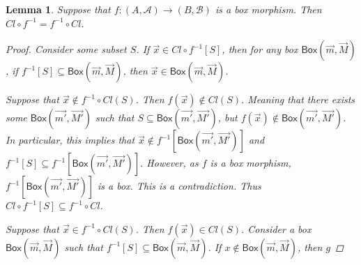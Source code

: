 \documentclass[12pt]{article}
\newtheorem{lemma}[theorem]{Lemma}
\newcommand{\bobject}{\mathsf{Box}}
\begin{document}
\begin{lemma}
    Suppose that $f:(A,\mathcal{A})\to(B,\mathcal{B})$ is a
    box morphism. Then $Cl\circ f^{-1}=f^{-1}\circ Cl$.
    \begin{proof}
        \par Consider some subset $S$.
        If $\vec{x}\in Cl\circ f^{-1}[S]$,
        then for any box $\bobject(\vec{m},\vec{M})$, if
        $f^{-1}[S]\subseteq \bobject(\vec{m},\vec{M})$, then
        $\vec{x}\in \bobject(\vec{m},\vec{M})$.
        \par Suppose that $\vec{x}\notin f^{-1}\circ Cl(S)$.
        Then $f(\vec{x})\notin Cl(S)$.
        Meaning that there exists some $\bobject(\vec{m'},\vec{M'})$ 
        such that $S\subseteq \bobject(\vec{m'},\vec{M'})$, but
        $f(\vec{x})\notin \bobject(\vec{m'},\vec{M'})$.
        In particular, this implies that
        $\vec{x}\notin f^{-1}[\bobject(\vec{m'},\vec{M'})]$ and
        $f^{-1}[S]\subseteq f^{-1}[\bobject(\vec{m'},\vec{M'})]$.
        However, as $f$ is a box morphism, $f^{-1}[\bobject(\vec{m'},\vec{M'})]$
        is a box. This is a contradiction. Thus
        $Cl\circ f^{-1}[S]\subseteq f^{-1}\circ Cl$.
        \par Suppose that $\vec{x}\in f^{-1}\circ Cl(S)$.
        Then $f(\vec{x})\in Cl(S)$. Consider a box $\bobject(\vec{m},\vec{M})$
        such that $f^{-1}[S]\subseteq \bobject(\vec{m},\vec{M})$. If
        $x\notin \bobject(\vec{m},\vec{M})$, then 
        $g$
    \end{proof}
\end{lemma}
\end{document}
